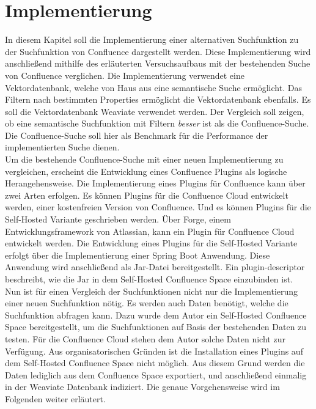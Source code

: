 \chapter{Implementierung}
In diesem Kapitel soll die Implementierung einer alternativen Suchfunktion zu der Suchfunktion von Confluence dargestellt werden.
Diese Implementierung wird anschließend mithilfe des erläuterten Versuchsaufbaus mit der bestehenden Suche von Confluence verglichen.
Die Implementierung verwendet eine Vektordatenbank, welche von Haus aus eine semantische Suche ermöglicht.
Das Filtern nach bestimmten Properties ermöglicht die Vektordatenbank ebenfalls.
Es soll die Vektordatenbank Weaviate verwendet werden.
Der Vergleich soll zeigen, ob eine semantische Suchfunktion mit Filtern \textit{besser} ist als die Confluence-Suche.
Die Confluence-Suche soll hier als Benchmark für die Performance der implementierten Suche dienen.\\

Um die bestehende Confluence-Suche mit einer neuen Implementierung zu vergleichen, erscheint die Entwicklung eines Confluence Plugins als logische Herangehensweise.
Die Implementierung eines Plugins für Confluence kann über zwei Arten erfolgen.
Es können Plugins für die Confluence Cloud entwickelt werden, einer kostenfreien Version von Confluence.
Und es können Plugins für die Self-Hosted Variante geschrieben werden.
Über Forge, einem Entwicklungsframework von Atlassian, kann ein Plugin für Confluence Cloud entwickelt werden.
Die Entwicklung eines Plugins für die Self-Hosted Variante erfolgt über die Implementierung einer Spring Boot Anwendung.
Diese Anwendung wird anschließend als Jar-Datei bereitgestellt.
Ein plugin-descriptor beschreibt, wie die Jar in dem Self-Hosted Confluence Space einzubinden ist.\\

Nun ist für einen Vergleich der Suchfunktionen nicht nur die Implementierung einer neuen Suchfunktion nötig.
Es werden auch Daten benötigt, welche die Suchfunktion abfragen kann.
Dazu wurde dem Autor ein Self-Hosted Confluence Space bereitgestellt, um die Suchfunktionen auf Basis der bestehenden Daten zu testen.
Für die Confluence Cloud stehen dem Autor solche Daten nicht zur Verfügung.
Aus organisatorischen Gründen ist die Installation eines Plugins auf dem Self-Hosted Confluence Space nicht möglich.
Aus diesem Grund werden die Daten lediglich aus dem Confluence Space exportiert, und anschließend einmalig in der Weaviate Datenbank indiziert.
Die genaue Vorgehensweise wird im Folgenden weiter erläutert.

